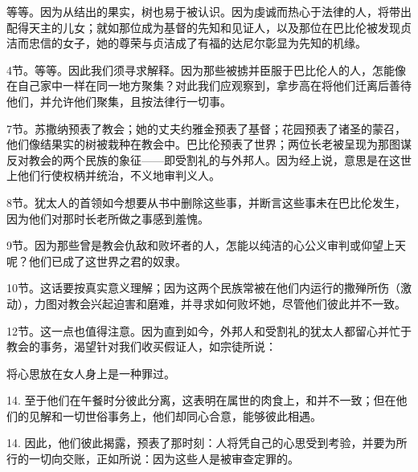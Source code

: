 等等。因为从结出的果实，树也易于被认识。因为虔诚而热心于法律的人，将带出配得天主的儿女；就如那位成为基督的先知和见证人，以及那位在巴比伦被发现贞洁而忠信的女子，她的尊荣与贞洁成了有福的达尼尔彰显为先知的机缘。\par

4节。等等。因此我们须寻求解释。因为那些被掳并臣服于巴比伦人的人，怎能像在自己家中一样在同一地方聚集？对此我们应观察到，拿步高在将他们迁离后善待他们，并允许他们聚集，且按法律行一切事。\par

7节。苏撒纳预表了教会；她的丈夫约雅金预表了基督；花园预表了诸圣的蒙召，他们像结果实的树被栽种在教会中。巴比伦预表了世界；两位长老被呈现为那图谋反对教会的两个民族的象征——即受割礼的与外邦人。因为经上说，意思是在这世上他们行使权柄并统治，不义地审判义人。\par

8节。犹太人的首领如今想要从书中删除这些事，并断言这些事未在巴比伦发生，因为他们对那时长老所做之事感到羞愧。\par

9节。因为那些曾是教会仇敌和败坏者的人，怎能以纯洁的心公义审判或仰望上天呢？他们已成了这世界之君的奴隶。\par

10节。这话要按真实意义理解；因为这两个民族常被在他们内运行的撒殚所伤（激动），力图对教会兴起迫害和磨难，并寻求如何败坏她，尽管他们彼此并不一致。\par

12节。这一点也值得注意。因为直到如今，外邦人和受割礼的犹太人都留心并忙于教会的事务，渴望针对我们收买假证人，如宗徒所说：\par

将心思放在女人身上是一种罪过。\par

14. 至于他们在午餐时分彼此分离，这表明在属世的肉食上，和并不一致；但在他们的见解和一切世俗事务上，他们却同心合意，能够彼此相遇。\par

14. 因此，他们彼此揭露，预表了那时刻：人将凭自己的心思受到考验，并要为所行的一切向交账，正如所说：因为这些人是被审查定罪的。\par

